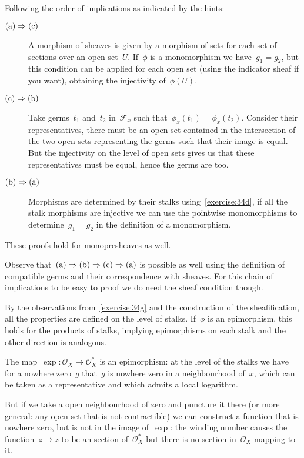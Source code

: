 \begin{exercise}
  Following the order of implications as indicated by the hints:
  \begin{description}
    \item[$\textnormal{(a)}\Rightarrow\textnormal{(c)}$] A morphism of sheaves is given by a morphism of sets for each set of sections over an open set~$U$. If~$\phi$ is a monomorphism we have~$g_1=g_2$, but this condition can be applied for each open set (using the indicator sheaf if you want), obtaining the injectivity of~$\phi(U)$.

    \item[$\textnormal{(c)}\Rightarrow\textnormal{(b)}$] Take germs~$t_1$ and~$t_2$ in~$\mathcal{F}_x$ such that~$\phi_x(t_1)=\phi_x(t_2)$. Consider their representatives, there must be an open set contained in the intersection of the two open sets representing the germs such that their image is equal. But the injectivity on the level of open sets gives us that these representatives must be equal, hence the germs are too.

    \item[$\textnormal{(b)}\Rightarrow\textnormal{(a)}$] Morphisms are determined by their stalks using~\autoref{exercise:34d}, if all the stalk morphisms are injective we can use the pointwise monomorphisms to determine~$g_1=g_2$ in the definition of a monomorphism.
  \end{description}

  These proofs hold for monopresheaves as well.

  Observe that~$\textnormal{(a)}\Rightarrow\textnormal{(b)}\Rightarrow\textnormal{(c)}\Rightarrow\textnormal{(a)}$ is possible as well using the definition of compatible germs and their correspondence with sheaves. For this chain of implications to be easy to proof we do need the sheaf condition though.
\end{exercise}

\begin{exercise}
  By the observations from~\autoref{exercise:34g} and the construction of the sheafification, all the properties are defined on the level of stalks. If~$\phi$ is an epimorphism, this holds for the products of stalks, implying epimorphisms on each stalk and the other direction is analogous.
\end{exercise}

\begin{exercise}
  The map~$\exp\colon\mathcal{O}_X\to\mathcal{O}_X^*$ is an epimorphism: at the level of the stalks we have for a nowhere zero~$g$ that~$g$ is nowhere zero in a neighbourhood of~$x$, which can be taken as a representative and which admits a local logarithm.

  But if we take a open neighbourhood of zero and puncture it there (or more general: any open set that is not contractible) we can construct a function that is nowhere zero, but is not in the image of~$\exp$: the winding number causes the function~$z\mapsto z$ to be an section of~$\mathcal{O}_X^*$ but there is no section in~$\mathcal{O}_X$ mapping to it.
\end{exercise}
